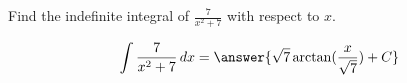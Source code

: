 \documentclass{ximera}
\author{Gregory Hartman \and Matthew Carr}
\begin{document}
\begin{exercise}

Find the indefinite integral of $\frac{7}{x^2+7}$ with respect to $x$.

\[
\int \frac{7}{x^2+7}\d x=\answer{\sqrt{7}\arctan(\frac{x}{\sqrt{7}})+C}
\]

\end{exercise}
\end{document}
